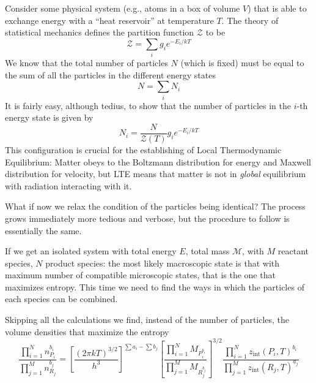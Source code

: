 Consider some physical system (e.g., atoms in a box of volume $V$) that is able to exchange energy with a “heat reservoir” at temperature $T$. The theory of statistical mechanics defines the partition function $\mathcal{Z}$ to be 
\begin{equation}
    \mathcal{Z} = \sum_{i}g_{i}e^{-E_{i}/kT}
\end{equation}
We know that the total number of particles $N$ (which is fixed) must be equal to the sum of all the particles in the different energy states
\begin{equation}
    N = \sum_{i}N_{i}
\end{equation}
It is fairly easy, although tedius, to show that the number of particles in the $i$-th energy state is given by 
\begin{equation}
    N_{i} = \frac{N}{\mathcal{Z}(T)}g_{i}e^{-E_{i}/kT}
\end{equation}
This configuration is crucial for the establishing of Local Thermodynamic Equilibrium: Matter obeys to the Boltzmann distribution for energy and Maxwell distribution for velocity, but LTE means that matter is not in \emph{global} equilibrium with radiation interacting with it.
\par What if now we relax the condition of the particles being identical? The process grows immediately more tedious and verbose, but the procedure to follow is essentially the same.
\par If we get an isolated system with total energy $E$, total mass $\mathcal{M}$, with $M$ reactant species, $N$ product species: the most likely macroscopic state is that with maximum number of compatible microscopic states, that is the one that maximizes entropy. This time we need to find the ways in which the particles of each species can be combined.
\par Skipping all the calculations we find, instead of the number of particles, the volume densities that maximize the entropy
\begin{equation}
    \boxed{
    \frac{\prod_{i=1}^{N}n_{P_{i}}^{b_{i}}}{\prod_{j=1}^{M}n_{R_{j}}^{b_{j}}} = \left[\frac{(2\pi kT)^{3/2}}{h^{3}}\right]^{\sum a_{i} - \sum b_{j}}\left[\frac{\prod_{i = 1}^{N}M_{P_{i}^{b_{i}}}}{\prod_{j = 1}^{M}M_{R_{j}^{b_{j}}}}\right]^{3/2}\frac{\prod_{i=1}^{N}z_{\text{int}}(P_{i}, T)^{b_{i}}}{\prod_{j=1}^{M}z_{\text{int}}(R_{j}, T)^{a_{j}}}
    }
    \label{eq:lawmassaction}
\end{equation}

